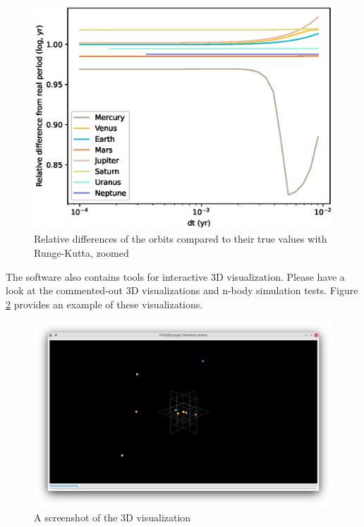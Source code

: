 \documentclass[a4paper]{article}
\begin{document}
\begin{figure}[ht!]
\centering
\includegraphics[width=\textwidth]{fig_3_rel_rk4_cut.eps}
\caption{Relative differences of the orbits compared to their true values with Runge-Kutta, zoomed}
\label{fig:3_rk_cut}
\end{figure}

\FloatBarrier
The software also contains tools for interactive 3D visualization.
Please have a look at the commented-out 3D visualizations and n-body simulation tests.
Figure \ref{fig:3d} provides an example of these visualizations.

\begin{figure}[ht!]
\centering
\includegraphics[width=\textwidth]{fig_3d_screenshot.png}
\caption{A screenshot of the 3D visualization}
\label{fig:3d}
\end{figure}
\end{document}

